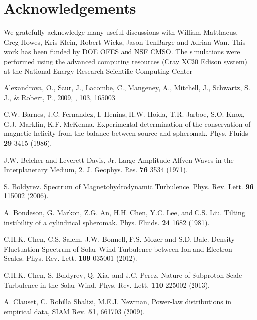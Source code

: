 \documentclass[preprint2]{aastex}
\begin{document}
\section*{Acknowledgements}
  We gratefully acknowledge many useful discussions with William Matthaeus, Greg Howes, Kris Klein, Robert Wicks, Jason TenBarge and Adrian Wan. This work has been funded by DOE OFES and NSF CMSO.  The simulations were performed using the advanced computing resources (Cray XC30 Edison system) at the National Energy Research Scientific Computing Center.
\begin{thebibliography}{}

 Alexandrova, O., Saur, J., Lacombe, C., Mangeney, A., Mitchell, J., Schwartz, S. J., \& Robert, P., 2009, \prl, 103, 165003

C.W. Barnes, J.C. Fernandez, I. Henins, H.W. Hoida, T.R. Jarboe, S.O. Knox, G.J. Marklin, K.F. McKenna. Experimental determination of the conservation of magnetic helicity from the balance between source and spheromak. Phys. Fluids {\bf 29} 3415 (1986).

 J.W. Belcher and Leverett Davis, Jr. Large-Amplitude Alfven Waves in the Interplanetary Medium, 2. J. Geophys. Res. {\bf 76} 3534 (1971).

 S. Boldyrev. Spectrum of Magnetohydrodynamic Turbulence. Phys. Rev. Lett. {\bf 96} 115002 (2006).

 A. Bondeson, G. Markon, Z.G. An, H.H. Chen, Y.C. Lee, and C.S. Liu. Tilting instibility of a cylindrical spheromak. Phys. Fluids. {\bf 24} 1682 (1981).

 C.H.K. Chen, C.S. Salem, J.W. Bonnell, F.S. Mozer and S.D. Bale. Density Fluctuation Spectrum of Solar Wind Turbulence between Ion and Electron Scales. Phys. Rev. Lett. {\bf 109} 035001 (2012).

 C.H.K. Chen, S. Boldyrev, Q. Xia, and J.C. Perez. Nature of Subproton Scale Turbulence in the Solar Wind. Phys. Rev. Lett. {\bf 110} 225002 (2013).

A. Clauset, C. Rohilla Shalizi, M.E.J. Newman, Power-law distributions in empirical data, SIAM Rev. {\bf 51}, 661703 (2009).


\end{thebibliography}
\end{document}
